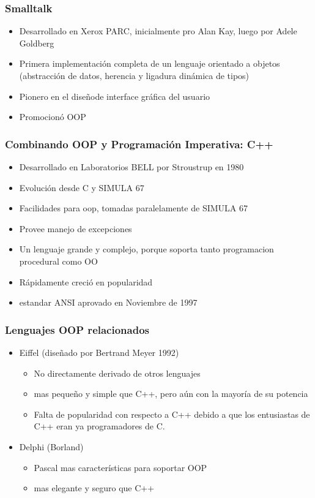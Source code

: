 \documentclass[11pt]{article}
\begin{document}
\subsubsection*{Smalltalk}
\label{sec:orgheadline95}
\begin{itemize}
\item Desarrollado en Xerox PARC, inicialmente pro Alan Kay, luego por
Adele Goldberg
\item Primera implementación completa de un lenguaje orientado a objetos
(abstracción de datos, herencia y ligadura dinámica de tipos)
\item Pionero en el diseñode interface gráfica del usuario
\item Promocionó OOP
\end{itemize}

\subsubsection*{Combinando OOP y Programación Imperativa: C++}
\label{sec:orgheadline96}
\begin{itemize}
\item Desarrollado en Laboratorios BELL por Stroustrup en 1980
\item Evolución desde C y SIMULA 67
\item Facilidades para oop, tomadas paralelamente de SIMULA 67
\item Provee manejo de excepciones
\item Un lenguaje grande y complejo, porque soporta tanto programacion procedural como OO
\item Rápidamente creció en popularidad
\item estandar ANSI aprovado en Noviembre de 1997
\end{itemize}

\subsubsection*{Lenguajes OOP relacionados}
\label{sec:orgheadline97}
\begin{itemize}
\item Eiffel (diseñado por Bertrand Meyer 1992)
\begin{itemize}
\item No directamente derivado de otros lenguajes
\item mas pequeño y simple que C++, pero aún con la mayoría de su potencia
\item Falta de popularidad con respecto a C++ debido a que los entusiastas
de C++ eran ya programadores de C.
\end{itemize}
\item Delphi (Borland)
\begin{itemize}
\item Pascal mas características para soportar OOP
\item mas elegante y seguro que C++
\end{itemize}
\end{itemize}
\end{document}
